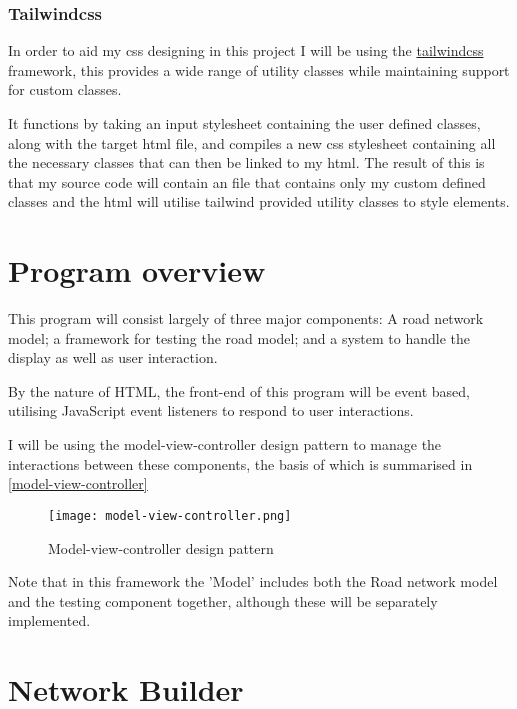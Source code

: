         \subsubsection{Tailwindcss}

            In order to aid my css designing in this project I will be using the \href{https://tailwindcss.com/}{tailwindcss} framework, this provides a wide range of utility classes while maintaining support for custom classes.

            It functions by taking an input stylesheet containing the user defined classes, along with the target html file, and compiles a new css stylesheet containing all the necessary classes that can then be linked to my html. The result of this is that my source code will contain an  file that contains only my custom defined classes and the html will utilise tailwind provided utility classes to style elements.

\section{Program overview}

    This program will consist largely of three major components: A road network model; a framework for testing the road model; and a system to handle the display as well as user interaction.

    By the nature of HTML, the front-end of this program will be event based, utilising JavaScript event listeners to respond to user interactions.

    I will be using the model-view-controller design pattern to manage the interactions between these components, the basis of which is summarised in \autoref{model-view-controller}

    \begin{figure}
        \centering
        \texttt{[image: model-view-controller.png]}
        \caption{Model-view-controller design pattern}
        \label{model-view-controller}
    \end{figure}

    Note that in this framework the 'Model' includes both the Road network model and the testing component together, although these will be separately implemented.

\section{Network Builder}

